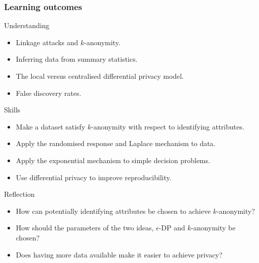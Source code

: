 \begin{frame}
  \frametitle{Learning outcomes}
  \begin{block}{Understanding}
    \begin{itemize}
    \item Linkage attacks and $k$-anonymity.
    \item Inferring data from summary statistics.
    \item The local versus centralised differential privacy model.
    \item False discovery rates.
    \end{itemize}
  \end{block}
  
  \begin{block}{Skills}
    \begin{itemize}
    \item Make a dataset satisfy $k$-anonymity with respect to identifying attributes.
    \item Apply the randomised response and Laplace mechanism to data.
    \item Apply the exponential mechanism to simple decision problems.
    \item Use differential privacy to improve reproducibility.
    \end{itemize}
  \end{block}

  \begin{block}{Reflection}
    \begin{itemize}
    \item How can potentially identifying attributes be chosen to achieve $k$-anonymity?
    \item How should the parameters of the two ideas, $\epsilon$-DP and $k$-anonymity be chosen?
    \item Does having more data available make it easier to achieve privacy?
    \end{itemize}
  \end{block}

\end{frame}

